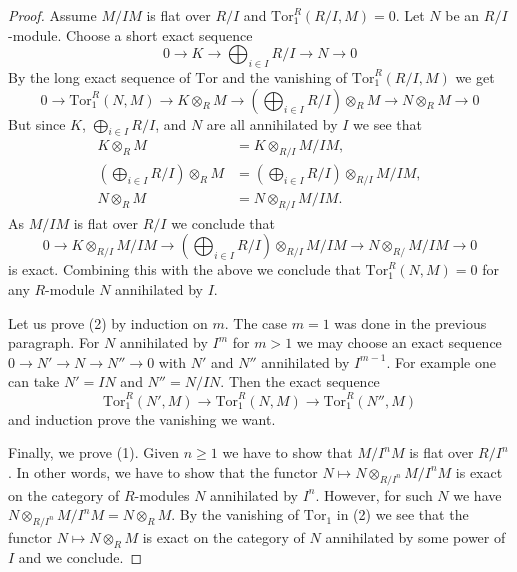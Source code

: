 \documentclass[10pt,a4paper]{amsart}
\theoremstyle{plain}
\theoremstyle{definition}
\theoremstyle{remark}
\numberwithin{equation}{subsection}
\begin{document}
\begin{proof}
Assume $M/IM$ is flat over $R/I$ and $\text{Tor}_1^R(R/I, M) = 0$.
Let $N$ be an $R/I$-module. Choose a short exact sequence
$$
0 \to K \to \bigoplus\nolimits_{i \in I} R/I \to N \to 0
$$
By the long exact sequence of $\text{Tor}$ and the vanishing of
$\text{Tor}_1^R(R/I, M)$ we get
$$
0 \to \text{Tor}_1^R(N, M) \to K \otimes_R M \to
(\bigoplus\nolimits_{i \in I} R/I) \otimes_R M \to N \otimes_R M \to 0
$$
But since $K$, $\bigoplus_{i \in I} R/I$, and $N$ are all annihilated
by $I$ we see that
\begin{align*}
K \otimes_R M & = K \otimes_{R/I} M/IM, \\
(\bigoplus\nolimits_{i \in I} R/I) \otimes_R M & =
(\bigoplus\nolimits_{i \in I} R/I) \otimes_{R/I} M/IM, \\
N \otimes_R M & = N \otimes_{R/I} M/IM.
\end{align*}
As $M/IM$ is flat over $R/I$ we conclude that
$$
0 \to K \otimes_{R/I} M/IM \to
(\bigoplus\nolimits_{i \in I} R/I) \otimes_{R/I} M/IM \to
N \otimes_{R/} M/IM \to 0
$$
is exact. Combining this with the above we conclude that
$\text{Tor}_1^R(N, M) = 0$ for any $R$-module $N$ annihilated by $I$.

\medskip\noindent
Let us prove (2) by induction on $m$. The case $m = 1$ was
done in the previous paragraph. For $N$ annihilated by $I^m$
for $m > 1$ we may choose an exact sequence
$0 \to N' \to N \to N'' \to 0$ with $N'$ and $N''$ annihilated
by $I^{m - 1}$. For example one can take $N' = IN$ and $N'' = N/IN$.
Then the exact sequence
$$
\text{Tor}_1^R(N', M) \to
\text{Tor}_1^R(N, M) \to
\text{Tor}_1^R(N'', M)
$$
and induction prove the vanishing we want.

\medskip\noindent
Finally, we prove (1). Given $n \geq 1$ we have to show that $M/I^nM$
is flat over $R/I^n$. In other words, we have to show that the functor
$N \mapsto N \otimes_{R/I^n} M/I^nM$ is exact on the category of $R$-modules
$N$ annihilated by $I^n$. However, for such $N$ we have
$N \otimes_{R/I^n} M/I^nM = N \otimes_R M$. By the vanishing of
$\text{Tor}_1$ in (2) we see that the functor $N \mapsto N \otimes_R M$
is exact on the category of $N$ annihilated by some power of $I$
and we conclude.
\end{proof}
\end{document}
